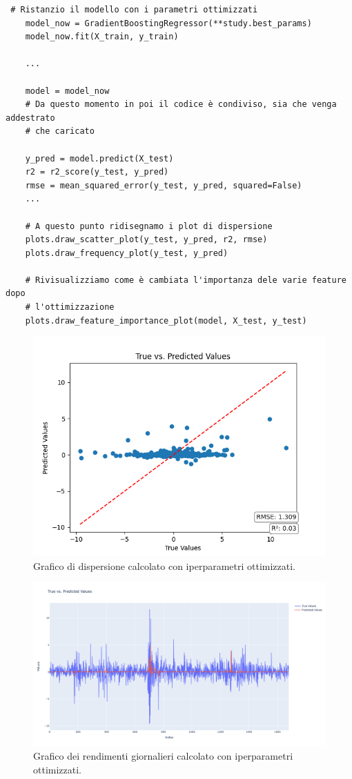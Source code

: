 \documentclass{article}
\begin{document}
\begin{verbatim} 
 # Ristanzio il modello con i parametri ottimizzati
    model_now = GradientBoostingRegressor(**study.best_params)
    model_now.fit(X_train, y_train)

    ...

    model = model_now
    # Da questo momento in poi il codice è condiviso, sia che venga addestrato 
    # che caricato

    y_pred = model.predict(X_test)
    r2 = r2_score(y_test, y_pred)
    rmse = mean_squared_error(y_test, y_pred, squared=False)
    ...

    # A questo punto ridisegnamo i plot di dispersione
    plots.draw_scatter_plot(y_test, y_pred, r2, rmse)
    plots.draw_frequency_plot(y_test, y_pred)

    # Rivisualizziamo come è cambiata l'importanza dele varie feature dopo 
    # l'ottimizzazione
    plots.draw_feature_importance_plot(model, X_test, y_test)
\end{verbatim}
\begin{figure}[H]
\centering
\includegraphics[width=1\linewidth]{scatterPlotOttimizzato.png}
\caption{\label{fig:scatterPlotOttimizzato}Grafico di dispersione calcolato con iperparametri ottimizzati.}
\end{figure}
\begin{figure}[H]
\centering
\includegraphics[width=1\linewidth]{frequencyOttimizzato.png}
\caption{\label{fig:scatterPlotOttimizzato}Grafico dei rendimenti giornalieri calcolato con iperparametri ottimizzati.}
\end{figure}
\end{document}
